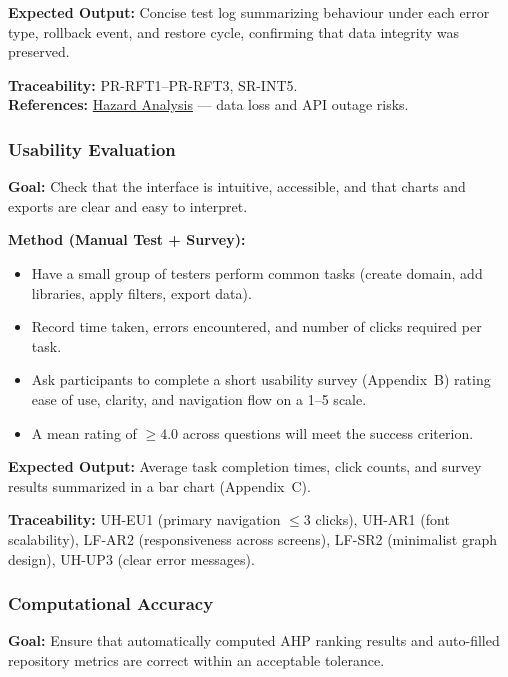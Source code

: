\documentclass[12pt, titlepage]{article}
\begin{document}
\textbf{Expected Output:} Concise test log summarizing behaviour under each error type, rollback event, and restore cycle, confirming that data integrity was preserved.

\textbf{Traceability:} PR-RFT1--PR-RFT3, SR-INT5.\\
\textbf{References:} \href{https://github.com/thaafei/DomainX/blob/main/docs/HazardAnalysis/HazardAnalysis.pdf}{Hazard Analysis} --- data loss and API outage risks.

\subsubsection{Usability Evaluation}
\label{subsubsec:usability}

\textbf{Goal:} Check that the interface is intuitive, accessible, and that charts and exports are clear and easy to interpret.

\textbf{Method (Manual Test + Survey):}
\begin{itemize}
  \item Have a small group of testers perform common tasks (create domain, add libraries, apply filters, export data).
  \item Record time taken, errors encountered, and number of clicks required per task.
  \item Ask participants to complete a short usability survey (Appendix~B) rating ease of use, clarity, and navigation flow on a 1--5 scale.
  \item A mean rating of \(\ge 4.0\) across questions will meet the success criterion.
\end{itemize}

\textbf{Expected Output:} Average task completion times, click counts, and survey results summarized in a bar chart (Appendix~C).

\textbf{Traceability:} UH-EU1 (primary navigation \(\le 3\) clicks), UH-AR1 (font scalability), LF-AR2 (responsiveness across screens), LF-SR2 (minimalist graph design), UH-UP3 (clear error messages).

\subsubsection{Computational Accuracy}
\label{subsubsec:accuracy}

\textbf{Goal:} Ensure that automatically computed AHP ranking results and auto-filled repository metrics are correct within an acceptable tolerance.
\end{document}
